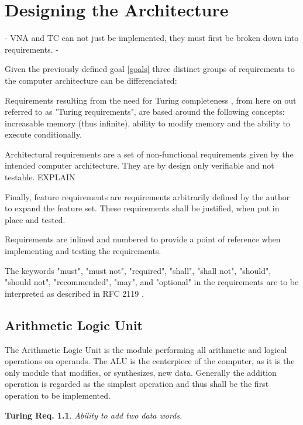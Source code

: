 \chapter{Designing the Architecture}
- VNA and TC can not just be implemented, they must first be broken down into requirements. 
-

Given the previously defined goal \ref{goals} three distinct groups of requirements to the computer architecture can be differenciated: 

Requirements resulting from the need for Turing completeness , from here on out referred to as "Turing requirements", are based around the following concepts: increasable memory (thus infinite), ability to modify memory and the ability to execute conditionally. 

Architectural requirements are a set of non-functional requirements given by the intended computer architecture. They are by design only verifiable and not testable. EXPLAIN

Finally, feature requirements are requirements arbitrarily defined by the author to expand the feature set. These requirements shall be justified, when put in place and tested.

Requirements are inlined and numbered to provide a point of reference when implementing and testing the requirements. 

\newtheorem{turing-requirement}{Turing Req.}[section]
\newtheorem{arch-requirement}{Arch. Req.}[section]
\newtheorem{feat-requirement}{Feat. Req.}[section]

The keywords "must", "must not", "required", "shall", "shall not", "should", "should not", "recommended",  "may", and "optional" in the requirements are to be interpreted as described in RFC 2119 \cite{rfc2119}.


\section{Arithmetic Logic Unit}
The Arithmetic Logic Unit is the module performing all arithmetic and logical operations on operands. The ALU is the centerpiece of the computer, as it is the only module that modifies, or synthesizes, new data. Generally the addition operation is regarded as the simplest operation and thus shall be the first operation to be implemented.

\begin{turing-requirement}
  Ability to add two data words.
\end{turing-requirement}

